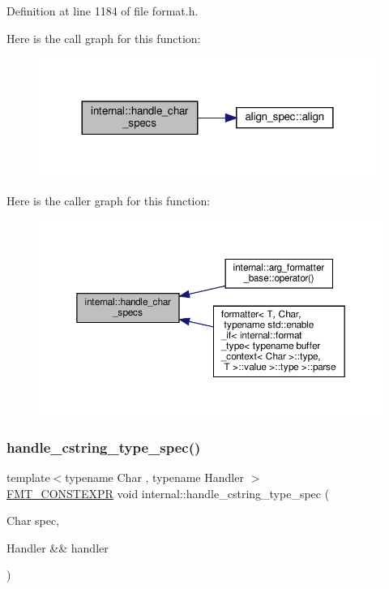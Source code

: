 Definition at line 1184 of file format.\+h.

Here is the call graph for this function\+:
\nopagebreak
\begin{figure}[H]
\begin{center}
\leavevmode
\includegraphics[width=312pt]{namespaceinternal_a0b130c25d32481413e2527484a1ec22b_cgraph}
\end{center}
\end{figure}
Here is the caller graph for this function\+:
\nopagebreak
\begin{figure}[H]
\begin{center}
\leavevmode
\includegraphics[width=350pt]{namespaceinternal_a0b130c25d32481413e2527484a1ec22b_icgraph}
\end{center}
\end{figure}
\mbox{\label{namespaceinternal_aacc088a314117542f56192ea07e12693}} 
\subsubsection{\texorpdfstring{handle\+\_\+cstring\+\_\+type\+\_\+spec()}{handle\_cstring\_type\_spec()}}
{\footnotesize\ttfamily template$<$typename Char , typename Handler $>$ \\
\hyperlink{core_8h_a69201cb276383873487bf68b4ef8b4cd}{F\+M\+T\+\_\+\+C\+O\+N\+S\+T\+E\+X\+PR} void internal\+::handle\+\_\+cstring\+\_\+type\+\_\+spec (\begin{DoxyParamCaption}\item[{Char}]{spec,  }\item[{Handler \&\&}]{handler }\end{DoxyParamCaption})}



